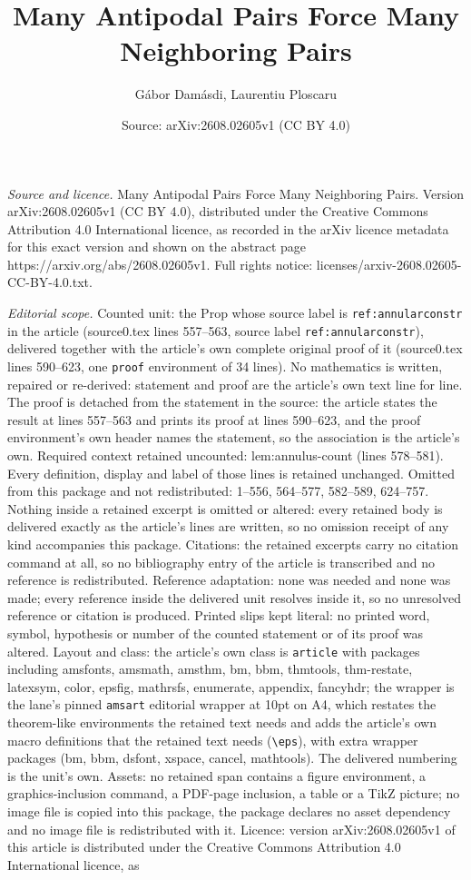 \documentclass[10pt,a4paper]{amsart}
\title[Many Antipodal Pairs Force Many Neighboring Pairs]{Many Antipodal Pairs Force Many Neighboring Pairs}
\author{G\'abor Dam\'asdi, Laurentiu Ploscaru}
\date{Source: arXiv:2608.02605v1 (CC BY 4.0)}
\begin{document}
\maketitle

\noindent\emph{Source and licence.} Many Antipodal Pairs Force Many Neighboring Pairs. Version arXiv:2608.02605v1 (CC BY 4.0), distributed under the Creative Commons Attribution 4.0 International licence, as recorded in the arXiv licence metadata for this exact version and shown on the abstract page https://arxiv.org/abs/2608.02605v1. Full rights notice: licenses/arxiv-2608.02605-CC-BY-4.0.txt.\par\smallskip

\noindent\textit{Editorial scope.} Counted unit: the Prop whose source label is \texttt{ref:annularconstr} in the article (source0.tex lines 557--563, source label \texttt{ref:annularconstr}), delivered together with the article's own complete original proof of it (source0.tex lines 590--623, one \texttt{proof} environment of 34 lines). No mathematics is written, repaired or re-derived: statement and proof are the article's own text line for line. The proof is detached from the statement in the source: the article states the result at lines 557--563 and prints its proof at lines 590--623, and the proof environment's own header names the statement, so the association is the article's own. Required context retained uncounted: lem:annulus-count (lines 578--581). Every definition, display and label of those lines is retained unchanged. Omitted from this package and not redistributed: 1--556, 564--577, 582--589, 624--757. Nothing inside a retained excerpt is omitted or altered: every retained body is delivered exactly as the article's lines are written, so no omission receipt of any kind accompanies this package. Citations: the retained excerpts carry no citation command at all, so no bibliography entry of the article is transcribed and no reference is redistributed. Reference adaptation: none was needed and none was made; every reference inside the delivered unit resolves inside it, so no unresolved reference or citation is produced. Printed slips kept literal: no printed word, symbol, hypothesis or number of the counted statement or of its proof was altered. Layout and class: the article's own class is \texttt{article} with packages including amsfonts, amsmath, amsthm, bm, bbm, thmtools, thm-restate, latexsym, color, epsfig, mathrsfs, enumerate, appendix, fancyhdr; the wrapper is the lane's pinned \texttt{amsart} editorial wrapper at 10pt on A4, which restates the theorem-like environments the retained text needs and adds the article's own macro definitions that the retained text needs (\texttt{\textbackslash eps}), with extra wrapper packages (bm, bbm, dsfont, xspace, cancel, mathtools). The delivered numbering is the unit's own. Assets: no retained span contains a figure environment, a graphics-inclusion command, a PDF-page inclusion, a table or a TikZ picture; no image file is copied into this package, the package declares no asset dependency and no image file is redistributed with it. Licence: version arXiv:2608.02605v1 of this article is distributed under the Creative Commons Attribution 4.0 International licence, as 
\end{document}
